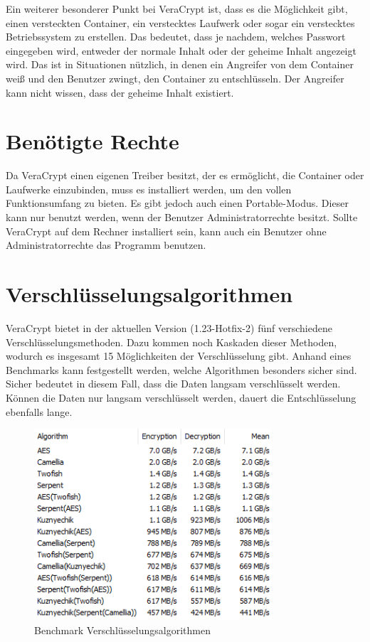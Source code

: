 \documentclass[12pt,a4paper]{scrreprt}
\begin{document}
\noindent Ein weiterer besonderer Punkt bei VeraCrypt ist, dass es die Möglichkeit gibt, einen versteckten Container, ein verstecktes Laufwerk oder sogar ein verstecktes Betriebssystem zu erstellen. Das bedeutet, dass je nachdem, welches Passwort eingegeben wird, entweder der normale Inhalt oder der geheime Inhalt angezeigt wird. Das ist in Situationen nützlich, in denen ein Angreifer von dem Container weiß und den Benutzer zwingt, den Container zu entschlüsseln. Der Angreifer kann nicht wissen, dass der geheime Inhalt existiert.

\section{Benötigte Rechte}
Da VeraCrypt einen eigenen Treiber besitzt, der es ermöglicht, die Container oder Laufwerke einzubinden, muss es installiert werden, um den vollen Funktionsumfang zu bieten. Es gibt jedoch auch einen Portable-Modus. Dieser kann nur benutzt werden, wenn der Benutzer Administratorrechte besitzt. Sollte VeraCrypt auf dem Rechner installiert sein, kann auch ein Benutzer ohne Administratorrechte das Programm benutzen.

\section{Verschlüsselungsalgorithmen}
VeraCrypt bietet in der aktuellen Version (1.23-Hotfix-2) fünf verschiedene Verschlüsselungsmethoden. Dazu kommen noch Kaskaden dieser Methoden, wodurch es insgesamt 15 Möglichkeiten der Verschlüsselung gibt. Anhand eines Benchmarks kann festgestellt werden, welche Algorithmen besonders sicher sind. Sicher bedeutet in diesem Fall, dass die Daten langsam verschlüsselt werden. Können die Daten nur langsam verschlüsselt werden, dauert die Entschlüsselung ebenfalls lange.\\

\begin{figure}[t]
\begin{center}
\includegraphics[width=250pt]{media/encryptionBenchmark.png}
\caption{Benchmark Verschlüsselungsalgorithmen}
\label{encbench}
\end{center}
\end{figure}
\end{document}
